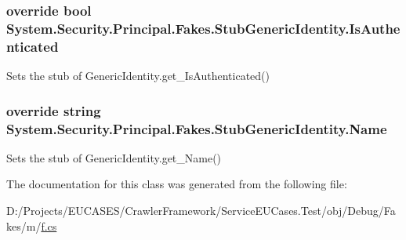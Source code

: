 \hypertarget{class_system_1_1_security_1_1_principal_1_1_fakes_1_1_stub_generic_identity_a2c5be58f3492ade7bbc7e724e2cb74a6}{
\subsubsection[{Is\-Authenticated}]{\setlength{\rightskip}{0pt plus 5cm}override bool System.\-Security.\-Principal.\-Fakes.\-Stub\-Generic\-Identity.\-Is\-Authenticated\hspace{0.3cm}{\ttfamily [get]}}}\label{class_system_1_1_security_1_1_principal_1_1_fakes_1_1_stub_generic_identity_a2c5be58f3492ade7bbc7e724e2cb74a6}


Sets the stub of Generic\-Identity.\-get\-\_\-\-Is\-Authenticated()

\hypertarget{class_system_1_1_security_1_1_principal_1_1_fakes_1_1_stub_generic_identity_a57006aacd0b428fd17ac9e899bff18ce}{
\subsubsection[{Name}]{\setlength{\rightskip}{0pt plus 5cm}override string System.\-Security.\-Principal.\-Fakes.\-Stub\-Generic\-Identity.\-Name\hspace{0.3cm}{\ttfamily [get]}}}\label{class_system_1_1_security_1_1_principal_1_1_fakes_1_1_stub_generic_identity_a57006aacd0b428fd17ac9e899bff18ce}


Sets the stub of Generic\-Identity.\-get\-\_\-\-Name()



The documentation for this class was generated from the following file\-:\begin{DoxyCompactItemize}
\item 
D\-:/\-Projects/\-E\-U\-C\-A\-S\-E\-S/\-Crawler\-Framework/\-Service\-E\-U\-Cases.\-Test/obj/\-Debug/\-Fakes/m/\hyperlink{m_2f_8cs}{f.\-cs}\end{DoxyCompactItemize}
